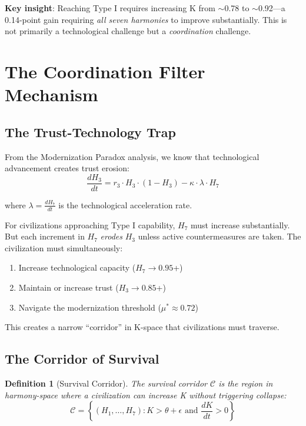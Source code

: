 \documentclass[11pt,a4paper]{article}
\newtheorem{definition}{Definition}
\begin{document}
\textbf{Key insight}: Reaching Type I requires increasing K from $\sim$0.78 to $\sim$0.92---a 0.14-point gain requiring \textit{all seven harmonies} to improve substantially. This is not primarily a technological challenge but a \textit{coordination} challenge.

\section{The Coordination Filter Mechanism}

\subsection{The Trust-Technology Trap}

From the Modernization Paradox analysis, we know that technological advancement creates trust erosion:
\begin{equation}
\frac{dH_3}{dt} = r_3 \cdot H_3 \cdot (1 - H_3) - \kappa \cdot \lambda \cdot H_7
\end{equation}

where $\lambda = \frac{dH_7}{dt}$ is the technological acceleration rate.

For civilizations approaching Type I capability, $H_7$ must increase substantially. But each increment in $H_7$ \textit{erodes} $H_3$ unless active countermeasures are taken. The civilization must simultaneously:
\begin{enumerate}
    \item Increase technological capacity ($H_7 \to 0.95$+)
    \item Maintain or increase trust ($H_3 \to 0.85$+)
    \item Navigate the modernization threshold ($\mu^* \approx 0.72$)
\end{enumerate}

This creates a narrow ``corridor'' in K-space that civilizations must traverse.

\subsection{The Corridor of Survival}

\begin{definition}[Survival Corridor]
The survival corridor $\mathcal{C}$ is the region in harmony-space where a civilization can increase K without triggering collapse:
\begin{equation}
\mathcal{C} = \left\{ (H_1, \ldots, H_7) : K > \theta + \epsilon \text{ and } \frac{dK}{dt} > 0 \right\}
\end{equation}
\end{definition}
\end{document}
